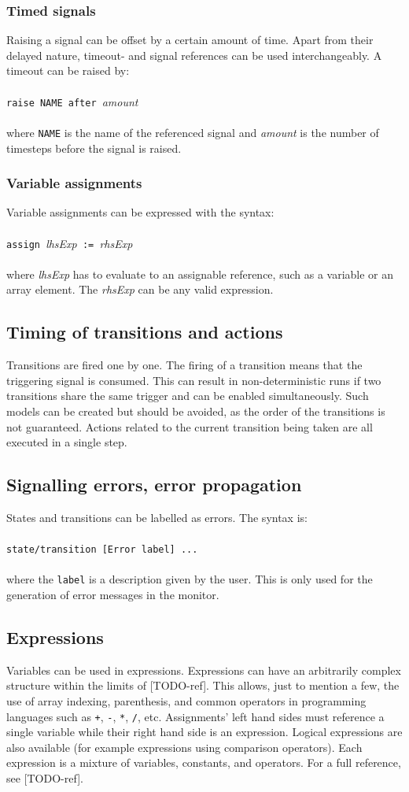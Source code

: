  \subsubsection{Timed signals}
Raising a signal can be offset by a certain amount of time. Apart from their delayed nature, timeout- and signal references can be used interchangeably. A timeout can be raised by:
\\\\\verb!raise NAME after !\textit{amount}\\\\
where \verb!NAME! is the name of the referenced signal and \textit{amount} is the number of timesteps before the signal is raised.
  \subsubsection{Variable assignments}
Variable assignments can be expressed with the syntax:
\\\\\verb!assign !\textit{lhsExp}\verb! := !\textit{rhsExp}\\\\
where \textit{lhsExp} has to evaluate to an assignable reference, such as a variable or an array element. The \textit{rhsExp} can be any valid expression.
  \subsection{Timing of transitions and actions}
Transitions are fired one by one. The firing of a transition means that the triggering signal is consumed. This can result in non-deterministic runs if two transitions share the same trigger and can be enabled simultaneously. Such models can be created but should be avoided, as the order of the transitions is not guaranteed. Actions related to the current transition being taken are all executed in a single step.
  \subsection{Signalling errors, error propagation}
States and transitions can be labelled as errors. The syntax is:
\\\\\verb!state/transition [Error label] ...!\\\\
where the \verb!label! is a description given by the user. This is only used for the generation of error messages in the monitor.
  \subsection{Expressions}
Variables can be used in expressions. Expressions can have an arbitrarily complex structure within the limits of [TODO-ref]. This allows, just to mention a few, the use of array indexing, parenthesis, and common operators in programming languages such as \verb!+!, \verb!-!, \verb!*!, \verb!/!, etc. Assignments' left hand sides must reference a single variable while their right hand side is an expression. Logical expressions are also available (for example expressions using comparison operators). Each expression is a mixture of variables, constants, and operators. For a full reference, see [TODO-ref].
